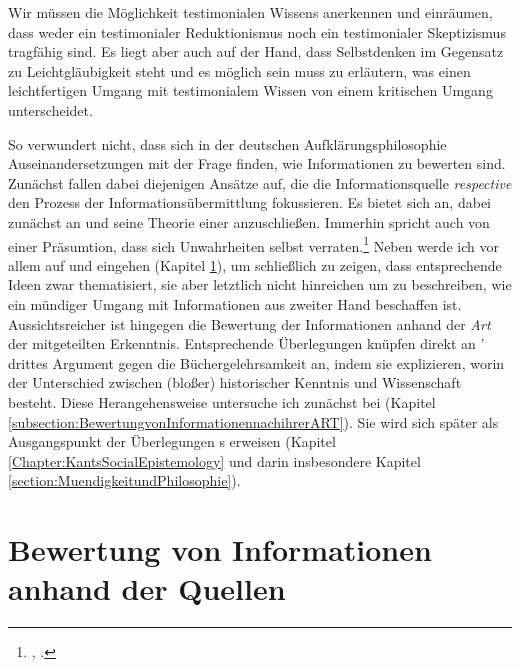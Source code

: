 
Wir müssen die Möglichkeit testimonialen Wissens anerkennen und einräumen, dass
weder ein testimonialer Reduktionismus noch ein testimonialer Skeptizismus tragfähig sind.
Es liegt aber auch auf der Hand, dass Selbstdenken im Gegensatz zu
Leichtgläubigkeit steht und es möglich sein muss zu
erläutern, was einen leichtfertigen Umgang mit testimonialem Wissen von einem
kritischen Umgang unterscheidet.

So verwundert nicht, dass sich in der deutschen Aufklärungsphilosophie
Auseinandersetzungen mit der Frage finden, wie Informationen zu bewerten sind.
Zunächst fallen dabei diejenigen Ansätze auf, die die Informationsquelle
\emph{respective} den Prozess der Informationsübermittlung fokussieren. Es
bietet sich an, dabei zunächst an
und seine Theorie einer  anzuschließen.
Immerhin spricht auch  von einer Präsumtion, dass sich
Unwahrheiten selbst verraten.\footnote{\cite[Vgl.][]{Kant:Reflexionen1900ff.}, \cite[][XVI: 430.6]{Kant:GesammelteWerke1900ff.}.} Neben
werde ich vor allem auf  und
eingehen (Kapitel \ref{subsection:BewertungvonInformationenanhandihrerQuellen}), um schließlich zu
zeigen, dass  entsprechende Ideen zwar thematisiert, sie
aber letztlich nicht hinreichen um zu beschreiben, wie ein mündiger Umgang mit
Informationen aus zweiter Hand beschaffen ist. Aussichtsreicher ist hingegen die
Bewertung der Informationen anhand der \emph{Art} der mitgeteilten Erkenntnis.
Entsprechende Überlegungen knüpfen direkt an
' drittes Argument gegen die
Büchergelehrsamkeit an, indem sie explizieren, worin der Unterschied zwischen
(bloßer) historischer Kenntnis  und Wissenschaft besteht. Diese Herangehensweise untersuche
ich zunächst bei  (Kapitel
\ref{subsection:BewertungvonInformationennachihrerART}). Sie wird
sich später als Ausgangspunkt der Überlegungen s erweisen
(Kapitel \ref{Chapter:KantsSocialEpistemology} und darin insbesondere Kapitel
\ref{section:MuendigkeitundPhilosophie}).

\section[Bewertung anhand
der Quellen]{Bewertung von Informationen anhand
der Quellen}\label{subsection:BewertungvonInformationenanhandihrerQuellen}

